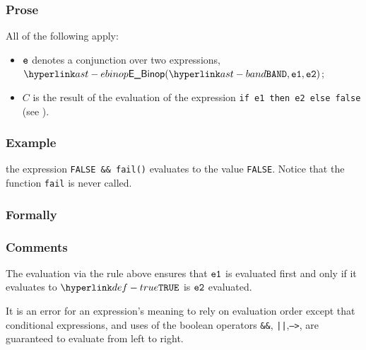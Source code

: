 \subsubsection{Prose}
All of the following apply:
\begin{itemize}
\item $\ve$ denotes a conjunction over two expressions,
      $\EBinop(\BAND, \veone, \vetwo)$;
\item $C$ is the result of the evaluation of the expression
      \texttt{if e1 then e2 else false} (see ).
\end{itemize}

\subsubsection{Example}
the expression \texttt{FALSE \&\& fail()} evaluates to the value \texttt{FALSE}. Notice that the function \texttt{fail} is never called.


\subsubsection{Formally}
\begin{mathpar}
\end{mathpar}

\subsubsection{Comments}
The evaluation via the rule above ensures that $\veone$ is evaluated first and
only if it evaluates to $\True$ is $\vetwo$ evaluated.



It is an error for an expression’s meaning to rely on evaluation order except
that conditional expressions, and uses of the boolean operators \texttt{\&\&},
\texttt{||},\texttt{-->}, are guaranteed to evaluate from left to right.


